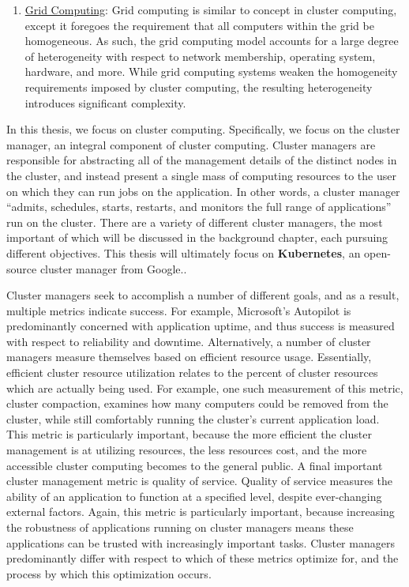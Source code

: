 \documentclass[twoside]{report}
\begin{document}
\begin{enumerate}
  \item \underline{Grid Computing}: Grid computing is similar to concept in
    cluster computing, except it foregoes the requirement that all computers
    within the grid be homogeneous. As such, the grid computing model accounts
    for a large degree of heterogeneity with respect to network membership,
    operating system, hardware, and more.\cite[pg.
    18]{distributed-systems-principles-and-paradigms} While grid computing
    systems weaken the homogeneity requirements imposed by cluster computing,
    the resulting heterogeneity introduces significant complexity.

\end{enumerate}

In this thesis, we focus on cluster computing. Specifically, we focus on the
cluster manager, an integral component of cluster computing. Cluster managers
are responsible for abstracting all of the management details of the distinct
nodes in the cluster, and instead present a single mass of computing resources
to the user on which they can run jobs on the application. In other words,
a cluster manager ``admits, schedules, starts, restarts, and monitors the full
range of applications'' run on the cluster.\cite[pg. 1]{borg} There are a
variety of different cluster managers, the most important of which will be
discussed in the background chapter, each pursuing different objectives. This
thesis will ultimately focus on \textbf{Kubernetes}, an open-source cluster
manager from Google.\cite{k8s-website}.

Cluster managers seek to accomplish a number of different goals, and as a
result, multiple metrics indicate success. For example, Microsoft's Autopilot is
predominantly concerned with application uptime, and thus success is measured
with respect to reliability and downtime.\cite[pg. 1]{autopilot}
Alternatively, a number of cluster managers measure themselves based on
efficient resource usage.\cite[pg. 7]{borg} Essentially, efficient cluster
resource utilization relates to the percent of cluster resources which are
actually being used. For example, one such measurement of this metric, cluster
compaction, examines how many computers could be removed from the cluster, while
still comfortably running the cluster's current application load.\cite[pg.
5]{evaluating-job-packing-in-warehouse-scale-computing} This metric is
particularly important, because the more efficient the cluster management is at
utilizing resources, the less resources cost, and the more accessible cluster
computing becomes to the general public. A final important
cluster management metric is quality of service. Quality of service measures the
ability of an application to function at a specified level, despite ever-changing
external factors. Again, this metric is particularly important, because
increasing the robustness of applications running on cluster managers means
these applications can be trusted with increasingly important tasks. Cluster
managers predominantly differ with respect to which of these metrics optimize
for, and the process by which this optimization occurs.
\end{document}
